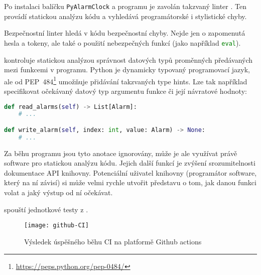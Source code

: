 Po instalaci balíčku \texttt{PyAlarmClock} a programu  je
zavolán takzvaný linter . Ten provádí statickou analýzu kódu
a vyhledává programátorské i stylistické chyby.

Bezpečnostní linter  hledá v kódu bezpečnostní chyby. Nejde
jen o zapomenutá hesla a tokeny, ale také o použití nebezpečných funkcí (jako
například \lstinline[language=Python]!eval!).

 kontroluje statickou analýzou správnost datových typů
proměnných předávaných mezi funkcemi v programu. Python je dynamicky typovaný
programovací jazyk, ale od
PEP~484\footnote{\url{https://peps.python.org/pep-0484/}} umožňuje přidávání
takzvaných \foreignlanguage{english}{type hints}. Lze tak například
specifikovat očekávaný datový typ argumentu funkce či její návratové hodnoty:
\begin{lstlisting}[language=Python]
def read_alarms(self) -> List[Alarm]:
    # ...

def write_alarm(self, index: int, value: Alarm) -> None:
    # ...
\end{lstlisting}
Za běhu programu jsou tyto anotace ignorovány, může je ale využívat právě
software pro statickou analýzu kódu. Jejich další funkcí je zvýšení
srozumitelnosti dokumentace API knihovny. Potenciální uživatel knihovny
(programátor software, který na ní závisí) si může velmi rychle utvořit
představu o tom, jak danou funkci volat a jaký výstup od ní očekávat.

 spouští jednotkové testy z .

\begin{figure}[htbp]
    \centering
    \texttt{[image: github-CI]}
    \caption{Výsledek úspěšného běhu \acs{CI} na platformě Github actions}
    \label{fig:PyAlarmClock CI}
\end{figure}
